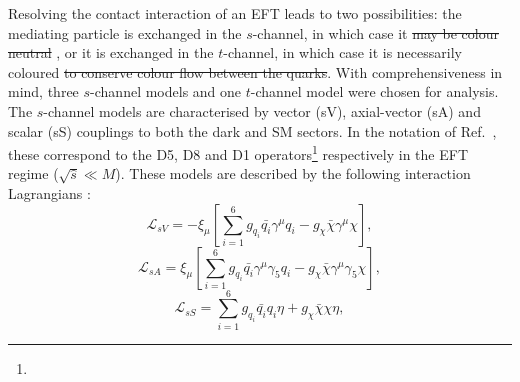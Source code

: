 \begin{flushleft}
 Resolving the contact interaction of an EFT  leads to two possibilities: the mediating particle is exchanged in the $s$-channel, in which case it \st{may be colour neutral} , or it is exchanged in the $t$-channel, in which case it is necessarily  coloured \st{to conserve colour flow between the quarks}. With comprehensiveness in mind, three  $s$-channel models and one $t$-channel model were chosen for analysis. The $s$-channel models are characterised by vector (sV), axial-vector (sA) and scalar (sS) couplings to both the dark and SM sectors. In the notation of Ref.~\cite{DMCons2}, these correspond to the D5, D8 and D1 operators\footnote{} respectively in the EFT regime ($\sqrt{\hat{s}} \ll M$).  These models are described by the following interaction Lagrangians :
\begin{equation}
\label{L_int_sV}
\mathcal{L}_{sV} = - \xi_{\mu}\left[ \sum\limits_{i=1}^{6} g_{q_i}\bar{q_i}\gamma^{\mu}q_i - g_{\chi}\bar{\chi}\gamma^{\mu}\chi\right],
\end{equation}
\begin{equation}
\label{L_int_sA}
\mathcal{L}_{sA} =  \xi_{\mu}\left[\sum\limits_{i=1}^{6} g_{q_i}\bar{q_i}\gamma^{\mu}\gamma_{5}q_i - g_{\chi}\bar{\chi}\gamma^{\mu}\gamma_{5}\chi\right],
\end{equation}
\begin{equation}
\label{L_int_sS}
\mathcal{L}_{sS} = \sum\limits_{i=1}^{6} g_{q_i}\bar{q_i}q_i\eta + g_{\chi}\bar{\chi}\chi\eta,
\end{equation}

\end{flushleft}
